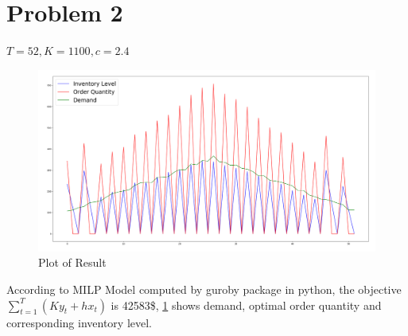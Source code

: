 \documentclass[a4paper]{article}
\begin{document}
\section{Problem 2}
$T=52,K=1100,c=2.4$
\begin{figure}[H]
    \centering
    \includegraphics[scale=0.2]{P1.png}
    \caption{Plot of Result}
    \label{P1}
\end{figure}
According to MILP Model computed by guroby package in python, the objective $\sum_{t=1}^T(Ky_t+hx_t)$ is 42583\$, \ref{P1} shows demand, optimal order quantity and corresponding inventory level.
\end{document}
